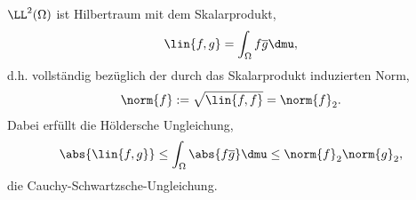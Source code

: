 \begin{bem}
\label{bem:3.77}
$\LL^2(\Omega)$ ist Hilbertraum mit dem Skalarprodukt,
\begin{align*}
\lin{f,g} = \int_\Omega f\overline{g}\dmu,
\end{align*}
d.h. vollständig bezüglich der durch das Skalarprodukt induzierten Norm,
\begin{align*}
\norm{f} := \sqrt{\lin{f,f}} = \norm{f}_2.
\end{align*}
Dabei erfüllt die Höldersche Ungleichung,
\begin{align*}
\abs{\lin{f,g}} \le \int_\Omega \abs{f\overline{g}}\dmu \le
\norm{f}_2\norm{g}_2,
\end{align*}
die Cauchy-Schwartzsche-Ungleichung.\maphere
\end{bem}